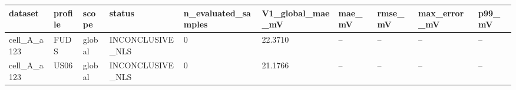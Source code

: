 \begin{tabular}{llllllllll}
\hline
dataset & profile & scope & status & n\_evaluated\_samples & V1\_global\_mae\_mV & mae\_mV & rmse\_mV & max\_error\_mV & p99\_mV \\
\hline
cell\_A\_a123 & FUDS & global & INCONCLUSIVE\_NLS & 0 & 22.3710 & -- & -- & -- & -- \\
cell\_A\_a123 & US06 & global & INCONCLUSIVE\_NLS & 0 & 21.1766 & -- & -- & -- & -- \\
\hline
\end{tabular}
